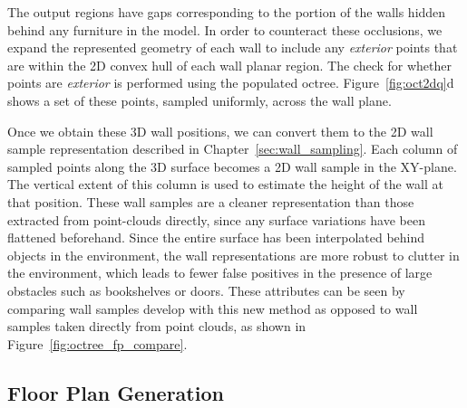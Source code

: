 \documentclass[12pt,onecolumn,oneside]{book}
\begin{document}
The output regions have gaps corresponding to the portion of the walls hidden behind any furniture in the model.  In order to counteract these occlusions, we expand the represented geometry of each wall to include any {\it exterior} points that are within the 2D convex hull of each wall planar region.  The check for whether points are {\it exterior} is performed using the populated octree.  Figure~\ref{fig:oct2dq}d shows a set of these points, sampled uniformly, across the wall plane.  

Once we obtain these 3D wall positions, we can convert them to the 2D wall sample representation described in Chapter~\ref{sec:wall_sampling}.  Each column of sampled points along the 3D surface becomes a 2D wall sample in the XY-plane.  The vertical extent of this column is used to estimate the height of the wall at that position.  These wall samples are a cleaner representation than those extracted from point-clouds directly, since any surface variations have been flattened beforehand.  Since the entire surface has been interpolated behind objects in the environment, the wall representations are more robust to clutter in the environment, which leads to fewer false positives in the presence of large obstacles such as bookshelves or doors.  These attributes can be seen by comparing wall samples develop with this new method as opposed to wall samples taken directly from point clouds, as shown in Figure~\ref{fig:octree_fp_compare}.

\subsection{Floor Plan Generation}
\label{ssec:octree_floorplan}
\end{document}
